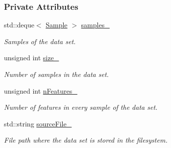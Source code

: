 \subsubsection*{Private Attributes}
\begin{CompactItemize}
\item 
\hypertarget{class_data_set_a7fbe1c9b16c2a001635e153ec1ca326}{
std::deque$<$ \hyperlink{class_data_set_7563096ce4847d88411ed3f6ad331310}{Sample} $>$ \hyperlink{class_data_set_a7fbe1c9b16c2a001635e153ec1ca326}{samples\_\-}}
\label{class_data_set_a7fbe1c9b16c2a001635e153ec1ca326}

\begin{CompactList}\small\item\em Samples of the data set. \item\end{CompactList}\item 
\hypertarget{class_data_set_b25b58d12a1f41ec758471bb663c8fa5}{
unsigned int \hyperlink{class_data_set_b25b58d12a1f41ec758471bb663c8fa5}{size\_\-}}
\label{class_data_set_b25b58d12a1f41ec758471bb663c8fa5}

\begin{CompactList}\small\item\em Number of samples in the data set. \item\end{CompactList}\item 
\hypertarget{class_data_set_5b263b90a7055808071f1c46e95b9b5c}{
unsigned int \hyperlink{class_data_set_5b263b90a7055808071f1c46e95b9b5c}{nFeatures\_\-}}
\label{class_data_set_5b263b90a7055808071f1c46e95b9b5c}

\begin{CompactList}\small\item\em Number of features in every sample of the data set. \item\end{CompactList}\item 
\hypertarget{class_data_set_f0e886e32a0ec23046e6e58813a3c69b}{
std::string \hyperlink{class_data_set_f0e886e32a0ec23046e6e58813a3c69b}{sourceFile\_\-}}
\label{class_data_set_f0e886e32a0ec23046e6e58813a3c69b}

\begin{CompactList}\small\item\em File path where the data set is stored in the filesystem. \item\end{CompactList}\end{CompactItemize}


